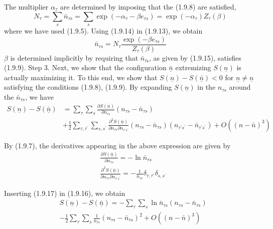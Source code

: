\documentclass{article}
\begin{document}
The multiplier $\alpha_{\tau}$ are determined by imposing that the (1.9.8) are satisfied,
$$
\begin{equation*}
N_{\tau}=\sum_{s} \bar{n}_{\tau s}=\sum_{s} \exp \left(-\alpha_{\tau}-\beta e_{\tau s}\right)=\exp \left(-\alpha_{\tau}\right) Z_{\tau}(\beta) \tag{1.9.14}
\end{equation*}
$$
where we have used (1.9.5). Using (1.9.14) in (1.9.13), we obtain
$$
\begin{equation*}
\bar{n}_{\tau s}=N_{\tau} \frac{\exp \left(-\beta e_{\tau s}\right)}{Z_{\tau}(\beta)} \tag{1.9.15}
\end{equation*}
$$
$\beta$ is determined implicitly by requiring that $\bar{n}_{\tau \mathcal{s}}$, as given by (1.9.15), satisfies (1.9.9).
Step 3. Next, we show that the configuration $\underline{\bar{n}}$ extremizing $S(\underline{n})$ is actually maximizing it. To this end, we show that $S(\underline{n})-S(\underline{\bar{n}})<0$ for $\underline{n} \neq \underline{n}$ satisfying the conditions (1.9.8), (1.9.9). By expanding $S(\underline{n})$ in the $n_{\tau s}$ around the $\bar{n}_{\tau s}$, we have
$$
\begin{align*}
S(\underline{n})-S(\underline{\bar{n}}) & =\sum_{\tau} \sum_{s} \frac{\partial S(\underline{\bar{n}})}{\partial n_{\tau s}}\left(n_{\tau s}-\bar{n}_{\tau s}\right)  \tag{1.9.16}\\
& +\frac{1}{2} \sum_{\tau, \tau^{\prime}} \sum_{s, s^{\prime}} \frac{\partial^{2} S(\underline{\bar{n}})}{\partial n_{\tau s} \partial n_{\tau^{\prime} s^{\prime}}}\left(n_{\tau s}-\bar{n}_{\tau s}\right)\left(n_{\tau^{\prime} s^{\prime}}-\bar{n}_{\tau^{\prime} s^{\prime}}\right)+O\left((n-\bar{n})^{3}\right)
\end{align*}
$$

By (1.9.7), the derivatives appearing in the above expression are given by
$$
\begin{align*}
& \frac{\partial S(\underline{\bar{n}})}{\partial n_{\tau s}}=-\ln \bar{n}_{\tau s}  \tag{1.9.17a}\\
& \frac{\partial^{2} S(\underline{\bar{n}})}{\partial n_{\tau s} \partial n_{\tau^{\prime} s^{\prime}}}=-\frac{1}{\bar{n}_{\tau s}} \delta_{\tau, \tau^{\prime}} \delta_{s, s^{\prime}} \tag{1.9.17b}
\end{align*}
$$

Inserting (1.9.17) in (1.9.16), we obtain
$$
\begin{align*}
& S(\underline{n})-S(\underline{\bar{n}})=-\sum_{\tau} \sum_{s} \ln \bar{n}_{\tau s}\left(n_{\tau s}-\bar{n}_{\tau s}\right)  \tag{1.9.18}\\
&-\frac{1}{2} \sum_{\tau} \sum_{s} \frac{1}{\bar{n}_{\tau s}}\left(n_{\tau s}-\bar{n}_{\tau s}\right)^{2}+O\left((n-\bar{n})^{3}\right)
\end{align*}
$$
\end{document}
